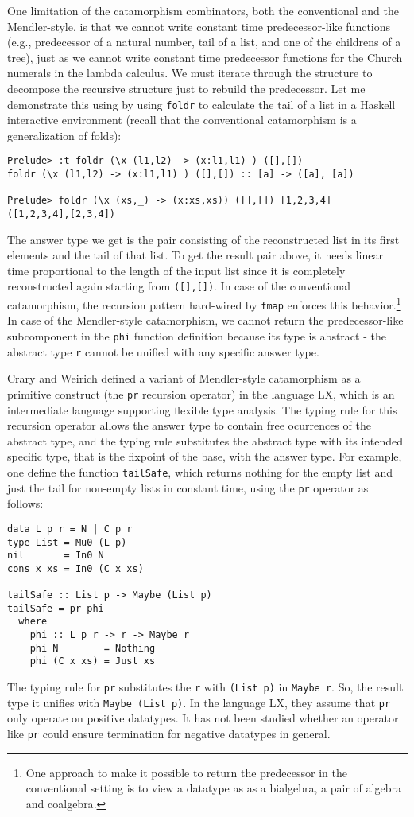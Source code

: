 \documentclass[letterpaper,12pt]{article}
\newcommand{\eg}[0]{e.g., }
\begin{document}
One limitation of the catamorphism combinators, both the conventional
and the Mendler-style, is that we cannot write constant time predecessor-like
functions (\eg predecessor of a natural number, tail of a list, and
one of the childrens of a tree), just as we cannot write constant time
predecessor functions for the Church numerals in the lambda calculus.
We must iterate through the structure to decompose the recursive structure
just to rebuild the predecessor.  Let me demonstrate this using by using
\verb|foldr| to calculate the tail of a list in a Haskell interactive
environment (recall that the conventional catamorphism is a generalization
of folds):
\begin{verbatim}
Prelude> :t foldr (\x (l1,l2) -> (x:l1,l1) ) ([],[])
foldr (\x (l1,l2) -> (x:l1,l1) ) ([],[]) :: [a] -> ([a], [a])

Prelude> foldr (\x (xs,_) -> (x:xs,xs)) ([],[]) [1,2,3,4]
([1,2,3,4],[2,3,4])
\end{verbatim}
The answer type we get is the pair consisting of
the reconstructed list in its first elements and
the tail of that list.  To get the result pair above,
it needs linear time proportional to the length of the input list
since it is completely reconstructed again starting from \verb|([],[])|.
In case of the conventional catamorphism, the recursion pattern hard-wired
by \verb|fmap| enforces this behavior.\footnote{
One approach to make it possible to return the predecessor in
the conventional setting is to view a datatype as as a bialgebra,
a pair of algebra and coalgebra\cite{Erw98}. }
In case of the Mendler-style
catamorphism, we cannot return the predecessor-like subcomponent in
the \verb|phi| function definition because its type is abstract
- the abstract type \verb|r| cannot be unified with any specific answer type.

Crary and Weirich\cite{CraWei99} defined a variant of Mendler-style
catamorphism as a primitive construct (the \verb|pr| recursion operator)
in the language LX, which is an intermediate language supporting
flexible type analysis.  The typing rule for this recursion operator
allows the answer type to contain free ocurrences of the abstract type,
and the typing rule substitutes the abstract type with its intended
specific type, that is the fixpoint of the base, with the answer type.
For example, one define the function \verb|tailSafe|, which returns nothing
for the empty list and just the tail for non-empty lists in constant time,
using the \verb|pr| operator as follows:
\begin{verbatim}
data L p r = N | C p r
type List = Mu0 (L p)
nil       = In0 N
cons x xs = In0 (C x xs)

tailSafe :: List p -> Maybe (List p)
tailSafe = pr phi
  where
    phi :: L p r -> r -> Maybe r
    phi N        = Nothing
    phi (C x xs) = Just xs
\end{verbatim}
The typing rule for \verb|pr| substitutes the \verb|r| with \verb|(List p)|
in \verb|Maybe r|. So, the result type it unifies with \verb|Maybe (List p)|.
In the language LX, they assume that \verb|pr| only operate on
positive datatypes. It has not been studied whether an operator like \verb|pr|
could ensure termination for negative datatypes in general.
\end{document}
